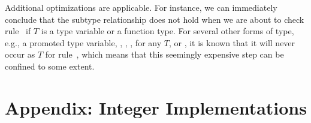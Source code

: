 \documentclass[makeidx]{article}
\begin{document}
{{Additional optimizations are applicable.
For instance,
we can immediately conclude that the subtype relationship does not hold
when we are about to check rule~\SrnSuperinterface{}
if $T$ is a type variable or a function type.
For several other forms of type, e.g.,
a promoted type variable,
, \DYNAMIC, \VOID,
 for any $T$, or \FUNCTION,
it is known that it will never occur as $T$ for rule~\SrnSuperinterface,
which means that this seemingly expensive step can be confined to some extent.%
}


\section*{Appendix: Integer Implementations}

}
\end{document}
